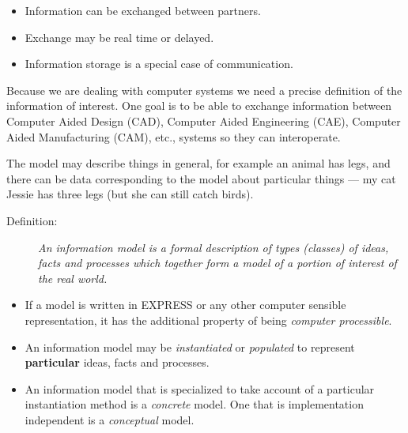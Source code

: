 \begin{itemize}
\item Information can be exchanged between partners.
\item Exchange may be real time or delayed.
\item Information storage is a special case of communication.
\end{itemize}

\begin{remarks}
\remintro
{}

    Because we are dealing with computer systems we need a precise
definition of the information of interest. One goal is to be able to
exchange information between Computer Aided Design (CAD), Computer Aided
Engineering (CAE), Computer Aided Manufacturing (CAM), etc., systems
so they can interoperate.

    The model may describe things in general, for example an animal has
legs, and there can be data corresponding to the model about particular
things --- my cat Jessie has three legs (but she can still catch birds).

\remend
\end{remarks}


\begin{description}
\item[Definition:] \emph{An information model is a formal description of types 
(classes) of ideas, facts and processes which together form a model of a 
portion of interest of the real world.}
\end{description}

\begin{itemize}
\item If a model is written in EXPRESS or any other computer sensible 
representation, it has the additional property of being \emph{computer 
processible}.
\item An information model may be \emph{instantiated} or \emph{populated} to
represent \textbf{particular} ideas, facts and processes.
\item An information model that is specialized to take account of a particular
instantiation method is a \emph{concrete} model. One that is implementation
independent is a \emph{conceptual} model.
\end{itemize}


